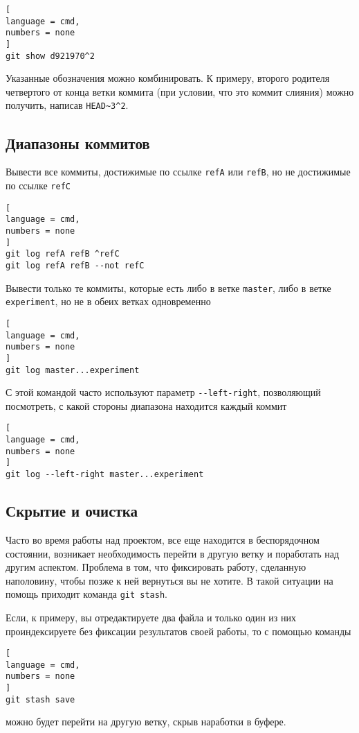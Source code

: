 \documentclass[%
	11pt,
	a4paper,
	utf8,
		]{article}
\begin{document}
\begin{lstlisting}[
language = cmd,
numbers = none
]
git show d921970^2
\end{lstlisting}

Указанные обозначения можно комбинировать. К примеру, второго родителя четвертого от конца ветки коммита (при условии, что это коммит слияния) можно получить, написав \lstinline{HEAD~3^2}.

\subsection{Диапазоны коммитов}

Вывести все коммиты, достижимые по ссылке \texttt{refA} или \texttt{refB}, но не достижимые по ссылке \texttt{refC}

\begin{lstlisting}[
language = cmd,
numbers = none
]
git log refA refB ^refC
git log refA refB --not refC
\end{lstlisting}

Вывести только те коммиты, которые есть либо в ветке \texttt{master}, либо в ветке \texttt{experiment}, но не в обеих ветках одновременно

\begin{lstlisting}[
language = cmd,
numbers = none
]
git log master...experiment
\end{lstlisting}

С этой командой часто используют параметр \lstinline{--left-right}, позволяющий посмотреть, с какой стороны диапазона находится каждый коммит

\begin{lstlisting}[
language = cmd,
numbers = none
]
git log --left-right master...experiment
\end{lstlisting}

\subsection{Скрытие и очистка}

Часто во время работы над проектом, все еще находится в беспорядочном состоянии, возникает необходимость перейти в другую ветку и поработать над другим аспектом. Проблема в том, что фиксировать работу, сделанную наполовину, чтобы позже к ней вернуться вы не хотите. В такой ситуации на помощь приходит команда \texttt{git stash}.

Если, к примеру, вы отредактируете два файла и только один из них проиндексируете без фиксации результатов своей работы, то с помощью команды
\begin{lstlisting}[
language = cmd,
numbers = none
]
git stash save
\end{lstlisting}
можно будет перейти на другую ветку, скрыв наработки в буфере.
\end{document}
